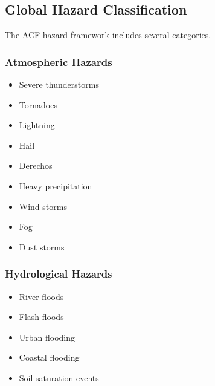 
\subsection{Global Hazard Classification}

The ACF hazard framework includes several categories.

\subsubsection{Atmospheric Hazards}

\begin{itemize}

\item Severe thunderstorms

\item Tornadoes

\item Lightning

\item Hail

\item Derechos

\item Heavy precipitation

\item Wind storms

\item Fog

\item Dust storms

\end{itemize}


\subsubsection{Hydrological Hazards}

\begin{itemize}

\item River floods

\item Flash floods

\item Urban flooding

\item Coastal flooding

\item Soil saturation events

\end{itemize}


